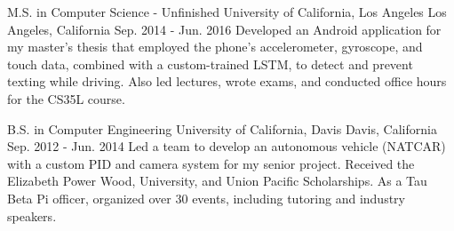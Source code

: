 

\begin{cventries}

  \cventry
    {M.S. in Computer Science - Unfinished} %
    {University of California, Los Angeles} %
    {Los Angeles, California} %
    {Sep. 2014 - Jun. 2016} %
    {Developed an Android application for my master's thesis that employed the phone's accelerometer, gyroscope, and touch data, combined with a custom-trained LSTM, to detect and prevent texting while driving. Also led lectures, wrote exams, and conducted office hours for the CS35L course.} %
    {}

  \cventry
    {B.S. in Computer Engineering} %
    {University of California, Davis} %
    {Davis, California} %
    {Sep. 2012 - Jun. 2014} %
    {Led a team to develop an autonomous vehicle (NATCAR) with a custom PID and camera system for my senior project. Received the Elizabeth Power Wood, University, and Union Pacific Scholarships. As a Tau Beta Pi officer, organized over 30 events, including tutoring and industry speakers.} %
    {}

\end{cventries}

